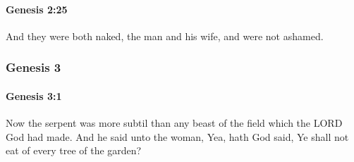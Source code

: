 		\paragraph{Genesis 2:25} %
			\label{GENESIS-2-25}

			And they were both naked, the man and his wife, and were not ashamed.

	\subsubsection{Genesis 3} %
		\label{GENESIS-3}

		\paragraph{Genesis 3:1} %
			\label{GENESIS-3-1}

			Now the serpent was more subtil than any beast of the field which the LORD God had made. And he said unto the woman, Yea, hath God said, Ye shall not eat of every tree of the garden?


